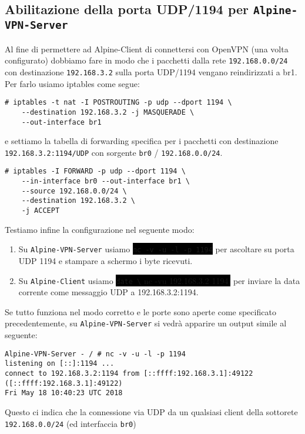 \documentclass{article}
\newcommand{\inlinecode}[1]{\colorbox{black}{\lstinline[basicstyle=\ttfamily\color{white}]|#1|}}
\newcommand{\varname}[1]{{\lstinline[basicstyle=\ttfamily\color{gray}]|#1|}}
\newcommand{\interface}[1]{{\lstinline[basicstyle=\ttfamily\color{brown}]|#1|}}
\newcommand{\ipaddress}[1]{{\lstinline[basicstyle=\ttfamily\color{purple}]|#1|}}
\newcommand{\hostname}[1]{{\lstinline[basicstyle=\ttfamily\color{teal}]|#1|}}
\begin{document}
\subsection{Abilitazione della porta UDP/1194 per \hostname{Alpine-VPN-Server}}
Al fine di permettere ad Alpine-Client di connettersi con OpenVPN (una volta configurato) dobbiamo
fare in modo che i pacchetti dalla rete \ipaddress{192.168.0.0/24} con destinazione \ipaddress{192.168.3.2} sulla porta UDP/1194
vengano reindirizzati a br1. Per farlo usiamo iptables come segue:

\begin{lstlisting}
# iptables -t nat -I POSTROUTING -p udp --dport 1194 \
    --destination 192.168.3.2 -j MASQUERADE \
    --out-interface br1
\end{lstlisting}
\vspace{1em}
e settiamo la tabella di forwarding specifica per i pacchetti con destinazione \ipaddress{192.168.3.2:1194/UDP}
con sorgente \interface{br0} / \ipaddress{192.168.0.0/24}.

\begin{lstlisting}
# iptables -I FORWARD -p udp --dport 1194 \
    --in-interface br0 --out-interface br1 \ 
    --source 192.168.0.0/24 \
    --destination 192.168.3.2 \
    -j ACCEPT
\end{lstlisting}
\vspace{1em}
Testiamo infine la configurazione nel seguente modo:
\begin{enumerate}
    \item Su \hostname{Alpine-VPN-Server} usiamo \inlinecode{nc -v -u -l -p 1194} per ascoltare su porta UDP 1194
    e stampare a schermo i byte ricevuti.
    \item Su \hostname{Alpine-Client} usiamo \inlinecode{date \| nc -vu 192.168.3.2 1194} per inviare la data
    corrente come messaggio UDP a 192.168.3.2:1194.
\end{enumerate}

Se tutto funziona nel modo corretto e le porte sono aperte come specificato precedentemente,
su \hostname{Alpine-VPN-Server} si vedrà apparire un output simile al seguente:
\begin{lstlisting}
Alpine-VPN-Server - / # nc -v -u -l -p 1194
listening on [::]:1194 ...
connect to 192.168.3.2:1194 from [::ffff:192.168.3.1]:49122 ([::ffff:192.168.3.1]:49122)
Fri May 18 10:40:23 UTC 2018
\end{lstlisting}

Questo ci indica che la connessione via UDP da un qualsiasi client della sottorete 
\ipaddress{192.168.0.0/24} (ed interfaccia \varname{br0})
\pagebreak
\end{document}
